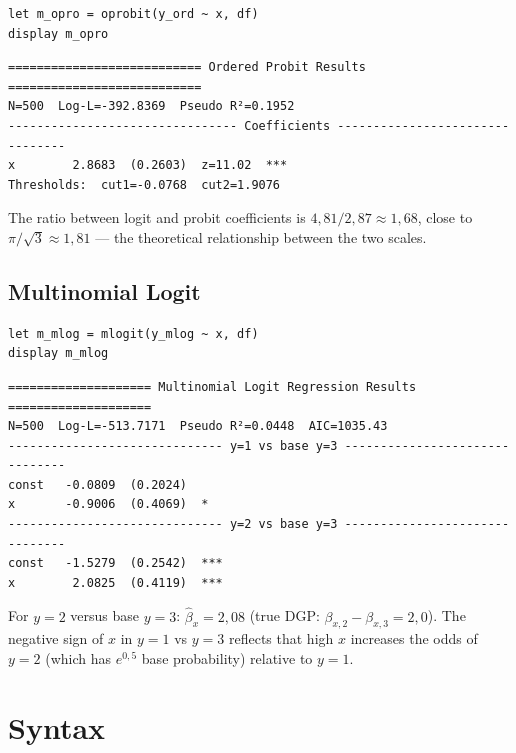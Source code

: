 \begin{lstlisting}
let m_opro = oprobit(y_ord ~ x, df)
display m_opro
\end{lstlisting}

\begin{lstlisting}[language={}, basicstyle=\ttfamily\small,
  frame=none, numbers=none, backgroundcolor=\color{codbg},
  xleftmargin=0pt, xrightmargin=0pt, breaklines=false]
=========================== Ordered Probit Results ===========================
N=500  Log-L=-392.8369  Pseudo R²=0.1952
-------------------------------- Coefficients --------------------------------
x        2.8683  (0.2603)  z=11.02  ***
Thresholds:  cut1=-0.0768  cut2=1.9076
\end{lstlisting}

The ratio between logit and probit coefficients is $4{,}81/2{,}87 \approx 1{,}68$,
close to $\pi/\sqrt{3} \approx 1{,}81$ — the theoretical relationship between the two
scales.

\subsection*{Multinomial Logit}

\begin{lstlisting}
let m_mlog = mlogit(y_mlog ~ x, df)
display m_mlog
\end{lstlisting}

\begin{lstlisting}[language={}, basicstyle=\ttfamily\small,
  frame=none, numbers=none, backgroundcolor=\color{codbg},
  xleftmargin=0pt, xrightmargin=0pt, breaklines=false]
==================== Multinomial Logit Regression Results ====================
N=500  Log-L=-513.7171  Pseudo R²=0.0448  AIC=1035.43
------------------------------ y=1 vs base y=3 -------------------------------
const   -0.0809  (0.2024)
x       -0.9006  (0.4069)  *
------------------------------ y=2 vs base y=3 -------------------------------
const   -1.5279  (0.2542)  ***
x        2.0825  (0.4119)  ***
\end{lstlisting}

For $y=2$ versus base $y=3$: $\hat\beta_x = 2{,}08$ (true DGP: $\beta_{x,2} - \beta_{x,3} = 2{,}0$). The negative sign of $x$ in $y=1$ vs $y=3$ reflects that high $x$ increases the odds of $y=2$ (which has $e^{0{,}5}$ base probability) relative to $y=1$.

\section{Syntax}

